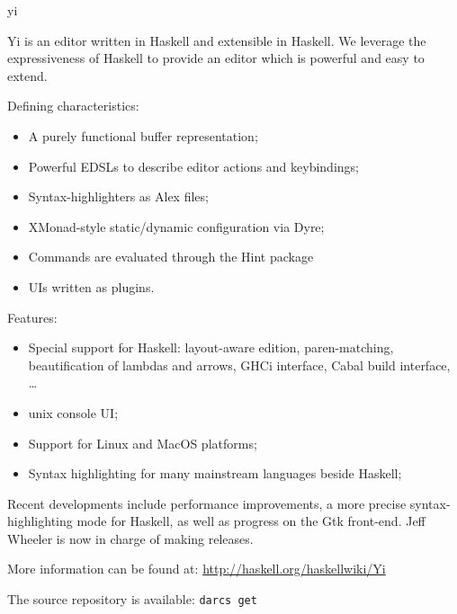 \begin{hcarentry}[updated]{yi}
\label{yi}
\makeheader

Yi is an editor written in Haskell and extensible in Haskell. We leverage the
expressiveness of Haskell to provide an editor which is powerful and easy to
extend.

Defining characteristics:
\begin{itemize}
\item A purely functional buffer representation;
\item Powerful EDSLs to describe editor actions and keybindings;
\item Syntax-highlighters as Alex files;
\item XMonad-style static/dynamic configuration via Dyre;
\item Commands are evaluated through the Hint package
\item UIs written as plugins.
\end{itemize}

Features:
\begin{itemize}
\item Special support for Haskell: layout-aware edition, paren-matching, beautification of lambdas and arrows, GHCi interface, Cabal build interface, \dots
\item unix console UI;
\item Support for Linux and MacOS platforms;
\item Syntax highlighting for many mainstream languages beside Haskell;
\end{itemize}

Recent developments include performance improvements, a more precise
syntax-highlighting mode for Haskell, as well as progress on the Gtk
front-end. Jeff Wheeler is now in charge of making releases.

\FurtherReading
\begin{compactitem}
\item More information can be found at:
 \url{http://haskell.org/haskellwiki/Yi}

\item The source repository is available:
 \texttt{darcs get}
\end{compactitem}
\end{hcarentry}

